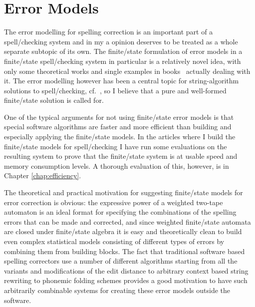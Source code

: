 \documentclass[officiallayout]{unihelcompling}
\begin{document}
\chapter{Error Models}
\label{chap:error-models}

The error modelling for spelling correction is an important part of a
spell\-/checking system and in my a opinion deserves to be treated as a whole
separate subtopic of its own. The finite\-/state formulation of error models in
a finite\-/state spell\-/checking system in particular is a relatively novel
idea, with only some theoretical works
\citep{agata2002typographical,mohri2003edit} and single examples in
books~\citep{beesley2003finite} actually dealing with it.  The error modelling
however has been a central topic for string-algorithm solutions to
spell\-/checking,
cf.~\citet{kukich1992spelling,mitton2009ordering,deorowicz2005correcting}, so I
believe that a pure and well-formed finite\-/state solution is called for.

One of the typical arguments for not using finite\-/state error models is that
special software algorithms are faster and more efficient than building and
especially applying the finite\-/state models. In the articles where I build
the finite\-/state models for spell\-/checking I have run some evaluations on
the resulting system to prove that the finite\-/state system is at usable speed
and memory consumption levels. A thorough evaluation of this, however, is in
Chapter \ref{chap:efficiency}.

The theoretical and practical motivation for suggesting finite\-/state models
for error correction is obvious: the expressive power of a weighted two-tape
automaton is an ideal format for specifying the combinations of the spelling
errors that can be made and corrected, and since weighted finite\-/state
automata are closed under finite\-/state algebra it is easy and theoretically
clean to build even complex statistical models consisting of different types of
errors by combining them from building blocks. The fact that traditional
software based spelling correctors use a number of different algorithms
starting from all the variants and modifications of the edit distance to
arbitrary context based string rewriting to phonemic folding schemes provides a
good motivation to have such arbitrarily combinable systems for creating these
error models outside the software.
\end{document}
